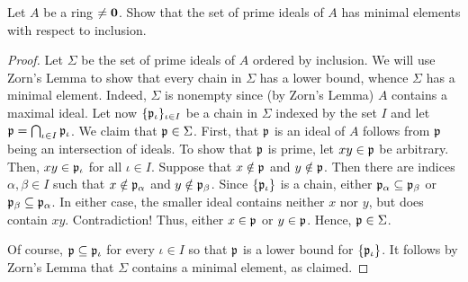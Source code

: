 \problem Let $A$ be a ring $\not=\zero$. Show that the set of prime ideals of $A$ has minimal elements with respect to inclusion.
\begin{proof}
    Let $\Sigma$ be the set of prime ideals of $A$ ordered by inclusion.
    We will use Zorn's Lemma to show that every chain in $\Sigma$ has a lower bound, whence $\Sigma$ has a minimal element.
    Indeed, $\Sigma$ is nonempty since (by Zorn's Lemma) $A$ contains a maximal ideal.
    Let now $\{\frak{p}_\iota\}_{\iota \in I}$ be a chain in $\Sigma$ indexed by the set $I$ and let $\frak{p} = \bigcap_{\iota \in I} \frak{p}_\iota$.
    We claim that $\frak{p} \in \Sigma$.
    First, that $\frak{p}$ is an ideal of $A$ follows from $\frak{p}$ being an intersection of ideals.
    To show that $\frak{p}$ is prime, let $xy \in \frak{p}$ be arbitrary.
    Then, $xy \in \frak{p}_\iota$ for all $\iota \in I$.
    Suppose that $x\notin \frak{p}$ and $y \notin \frak{p}$.
    Then there are indices $\alpha, \beta \in I$ such that $x \notin \frak{p}_\alpha$ and $y\notin \frak{p}_\beta$.
    Since $\{\frak{p}_\iota\}$ is a chain, either $\frak{p}_\alpha \subseteq \frak{p}_\beta$ or $\frak{p}_\beta \subseteq \frak{p}_\alpha$.
    In either case, the smaller ideal contains neither $x$ nor $y$, but does contain $xy$. Contradiction!
    Thus, either $x\in \frak{p}$ or $y \in \frak{p}$. Hence, $\frak{p} \in \Sigma$.

    Of course, $\frak{p} \subseteq \frak{p}_\iota$ for every $\iota \in I$ so that $\frak{p}$ is a lower bound for $\{\frak{p}_\iota\}$.
    It follows by Zorn's Lemma that $\Sigma$ contains a minimal element, as claimed.
\end{proof}